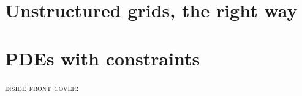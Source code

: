 \documentclass{tufte-book}
\newcommand{\CODELOC}{}  %
\newcommand{\stubinput}[2]{}
\newcommand{\stubinput}[2]{Percent completed: #2\%.}
\theoremstyle{definition}
\begin{document}
\chapter{Unstructured grids, the right way}
\label{chap:dmplex}
\renewcommand{\CODELOC}{c/ch10/}
\stubinput{dmplex.tex}{0}

\chapter{PDEs with constraints}
\label{chap:constrained}
\renewcommand{\CODELOC}{c/ch11/}
\stubinput{constrained.tex}{20}


\backmatter




\clearpage

\newcommand{\tblockeqncode}[3]{
\begin{tabular}[t]{l} #1: \\ \qquad {\small #2} \\ \quad {\large \underline{\texttt{#3}}} \end{tabular}
}
\newcommand{\tblockcode}[2]{
\begin{tabular}[t]{l} #1 \\ \quad {\large \underline{\texttt{#2}}} \end{tabular}
}
\newcommand{\tblock}[1]{
\begin{tabular}[t]{l} #1 \end{tabular}
}

\thispagestyle{empty}
\noindent \textsc{inside front cover:}
\end{document}
